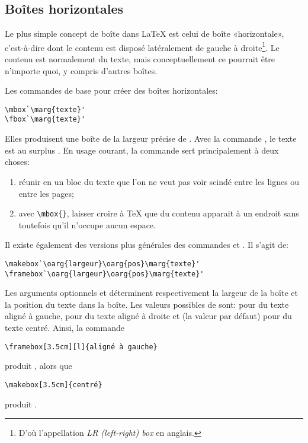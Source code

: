 \subsection{Boîtes horizontales}
\label{sec:tableaux:boites:lrbox}

Le plus simple concept de boîte dans {\LaTeX} est celui de boîte
«horizontale», c'est-à-dire dont le contenu est disposé latéralement
de gauche à droite\footnote{%
  D'où l'appellation \emph{LR (left-right) box} en anglais.}. %
Le contenu est normalement du texte, mais conceptuellement ce pourrait
être n'importe quoi, y compris d'autres boîtes.

Les commandes de base pour créer des boîtes horizontales:
\begin{lstlisting}
\mbox`\marg{texte}'
\fbox`\marg{texte}'
\end{lstlisting}
Elles produisent une boîte de la largeur précise de . Avec
la commande \cmd{\fbox}, le texte est au surplus . En
usage courant, la commande  sert principalement à deux
choses:
\begin{enumerate}
\item réunir en un bloc du texte que l'on ne veut pas voir scindé
  entre les lignes ou entre les pages;
\item \label{item:tableaux:mbox} avec \verb=\mbox{}=, laisser croire à
  {\TeX} que du contenu apparait à un endroit sans toutefois qu'il
  n'occupe aucun espace.
\end{enumerate}

Il existe également des versions plus générales des commandes
\cmd{\mbox} et \cmd{\fbox}. Il s'agit de:
\begin{lstlisting}
\makebox`\oarg{largeur}\oarg{pos}\marg{texte}'
\framebox`\oarg{largeur}\oarg{pos}\marg{texte}'
\end{lstlisting}
Les arguments optionnels  et  déterminent
respectivement la largeur de la boîte et la position du texte
dans la boîte. Les valeurs possibles de  sont:  pour
du texte aligné à gauche,  pour du texte aligné à droite et
 (la valeur par défaut) pour du texte centré. Ainsi, la commande
\begin{lstlisting}
\framebox[3.5cm][l]{aligné à gauche}
\end{lstlisting}
produit , alors que
\begin{lstlisting}
\makebox[3.5cm]{centré}
\end{lstlisting}
produit .

